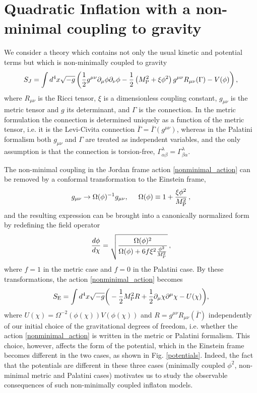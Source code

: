 \documentclass[11pt,a4paper]{article}
\newcommand{\be}{\begin{equation}} %
\newcommand{\ee}{\end{equation}}
\begin{document}
\section{Quadratic Inflation with a non-minimal coupling to gravity}
\label{quadr_inf_nonmin}

We consider a theory which contains not only the usual kinetic and potential terms but which is non-minimally coupled to gravity
\be
\label{nonminimal_action}
S_J = \int d^4x \sqrt{-g}\left(\frac{1}{2} g^{\mu\nu}\partial_{\mu}\phi\partial_{\nu}\phi -\frac{1}{2}\left(M_{\rm P}^2 + \xi\phi^2\right) g^{\mu\nu}R_{\mu\nu}(\Gamma) - V(\phi)\right) ,
\ee
where $R_{\mu\nu}$ is the Ricci tensor, $\xi$ is a dimensionless coupling constant, $g_{\mu\nu}$ is the metric tensor and $g$ its determinant, and $\Gamma$ is the connection. In the metric formulation the connection is determined uniquely as a function of the metric tensor, i.e. it is the Levi-Civita connection $\bar{\Gamma}=\bar{\Gamma}(g^{\mu\nu})$, whereas in the Palatini formalism both $g_{\mu\nu}$ and $\Gamma$ are treated as independent variables, and the only assumption is that the connection is torsion-free, $\Gamma^\lambda_{\alpha\beta}=\Gamma^\lambda_{\beta\alpha}$.
	
The non-minimal coupling in the Jordan frame action \eqref{nonminimal_action} can be removed by a conformal transformation to the Einstein frame, 
\begin{equation}
\label{Omega}
g_{\mu\nu} \to \Omega(\phi)^{-1}g_{\mu\nu}, \hspace{.5cm} \Omega(\phi)\equiv 1+\frac{\xi \phi^2}{M_{\rm P}^2} \, ,
\end{equation}	
and the resulting expression can be brought into a canonically normalized form by redefining the field operator
\be
\label{chi}
\frac{d\phi}{d\chi} = \sqrt{\frac{\Omega(\phi)^2}{\Omega(\phi)+6f\xi^2\frac{\phi^2}{M_{\rm P}^2}}} \,,
\ee
where $f=1$ in the metric case and $f=0$ in the Palatini case. By these transformations, the action \eqref{nonminimal_action} becomes
\be
S_{\rm E} = \int d^4x \sqrt{-g}\bigg(-\frac{1}{2}M_{\rm P}^2R +\frac{1}{2}{\partial}_{\mu}\chi{\partial}^{\mu}\chi - U(\chi)  \bigg),
\label{EframeS}
\ee
where $U(\chi) = \Omega^{-2}(\phi(\chi))V(\phi(\chi))$ and $R = g^{\mu\nu}R_{\mu\nu}(\bar{\Gamma})$ independently of our initial choice of the gravitational degrees of freedom, i.e. whether the action \eqref{nonminimal_action} is written in the metric or Palatini formalism. This choice, however, affects the form of the potential, which in the Einstein frame becomes different in the two cases, as shown in Fig. \ref{potentials}. Indeed, the fact that the potentials are different in these three cases (minimally coupled $\phi^2$, non-minimal metric and Palatini cases) motivates us to study the observable consequences of such non-minimally coupled inflaton models.
\end{document}
